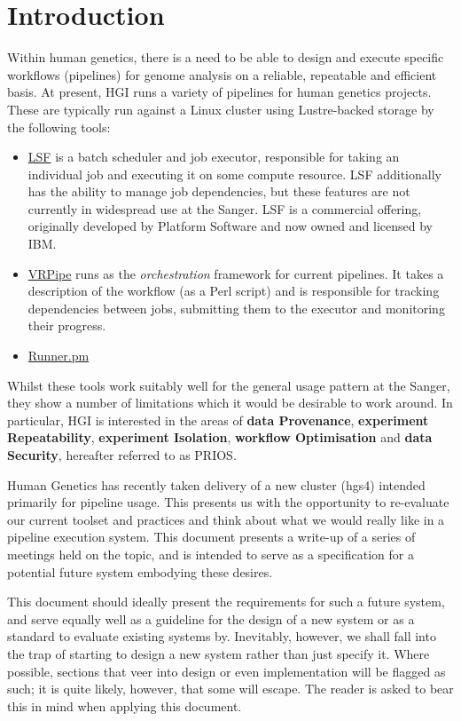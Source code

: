 \documentclass[10pt,a4paper]{article}
\newcommand{\npar}{\par\noindent\space}
\begin{document}
\section{Introduction}
\npar Within human genetics, there is a need to be able to design and execute specific \glspl{workflow} (\glspl{pipeline}) for genome analysis on a reliable, repeatable and efficient basis. At present, HGI runs a variety of pipelines for human genetics projects. These are typically run against a Linux cluster using Lustre-backed storage by the following tools: 
\begin{itemize}
\item \href{http://www.ibm.com/systems/platformcomputing/products/lsf/}{LSF} is a batch scheduler and job executor, responsible for taking an individual job and executing it on some compute resource. LSF additionally has the ability to manage job dependencies, but these features are not currently in widespread use at the Sanger. LSF is a commercial offering, originally developed by Platform Software and now owned and licensed by IBM. 
\item \href{https://github.com/VertebrateResequencing/vr-pipe}{VRPipe} runs as the \textit{orchestration} framework for current pipelines. It takes a description of the workflow (as a Perl script) and is responsible for tracking dependencies between jobs, submitting them to the executor and monitoring their progress.
\item \href{https://github.com/wtsi-hgi/vr-codebase/blob/master/modules/Runner.pm}{Runner.pm}
\end{itemize}
\npar Whilst these tools work suitably well for the general usage pattern at the Sanger, they show a number of limitations which it would be desirable to work around. In particular, HGI is interested in the areas of \textbf{data Provenance}, \textbf{experiment Repeatability}, \textbf{experiment Isolation}, \textbf{workflow Optimisation} and \textbf{data Security}, hereafter referred to as PRIOS.
\npar Human Genetics has recently taken delivery of a new cluster (hgs4) intended primarily for pipeline usage. This presents us with the opportunity to re-evaluate our current toolset and practices and think about what we would really like in a pipeline execution system. This document presents a write-up of a series of meetings held on the topic, and is intended to serve as a specification for a potential future system embodying these desires.
\npar This document should ideally present the requirements for such a future system, and serve equally well as a guideline for the design of a new system or as a standard to evaluate existing systems by. Inevitably, however, we shall fall into the trap of starting to design a new system rather than just specify it. Where possible, sections that veer into design or even implementation will be flagged as such; it is quite likely, however, that some will escape. The reader is asked to bear this in mind when applying this document.
\end{document}
